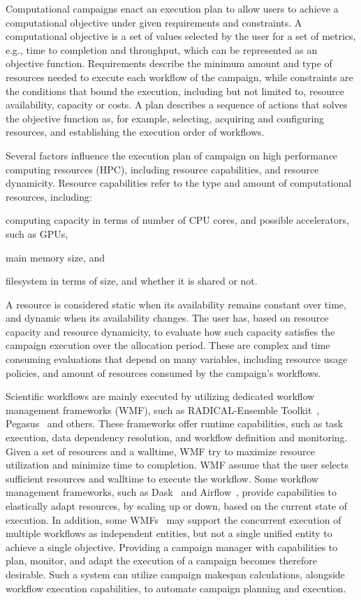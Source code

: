 Computational campaigns enact an execution plan to allow users to achieve a computational objective under given requirements and constraints.
A computational objective is a set of values selected by the user for a set of metrics, e.g., time to completion and throughput, which can be represented as an objective function.
Requirements describe the minimum amount and type of resources needed to execute each workflow of the campaign, while constraints are the conditions that bound the execution, including but not limited to, resource availability, capacity or costs.
A plan describes a sequence of actions that solves the objective function as, for example, selecting, acquiring and configuring resources, and establishing the execution order of workflows.

Several factors influence the execution plan of campaign on high performance computing resources (HPC), including resource capabilities, and resource dynamicity.
Resource capabilities refer to the type and amount of computational resources, including: 
\begin{inparaenum}[1)]
\item computing capacity in terms of number of CPU cores, and possible accelerators, such as GPUs,
\item main memory size, and
\item filesystem in terms of size, and whether it is shared or not.
\end{inparaenum}
A resource is considered static when its availability remains constant over time, and dynamic when its availability changes.
The user has, based on resource capacity and resource dynamicity, to evaluate how such capacity satisfies the campaign execution over the allocation period.
These are complex and time consuming evaluations that depend on many variables, including resource usage policies, and amount of resources consumed by the campaign’s workflows.

Scientific workflows are mainly executed by utilizing dedicated workflow management frameworks (WMF), such as RADICAL-Ensemble Toolkit~\cite{balasubramanian2018harnessing}, Pegasus~\cite{deelman2015pegasus} and others.
These frameworks offer runtime capabilities, such as task execution, data dependency resolution, and workflow definition and monitoring.
Given a set of resources and a walltime, WMF try to maximize resource utilization and minimize time to completion.
WMF assume that the user selects sufficient resources and walltime to execute the workflow.
Some workflow management frameworks, such as Dask~\cite{rocklin2015dask} and Airflow~\cite{airflow}, provide capabilities to elastically adapt resources, by scaling up or down, based on the current state of execution.
In addition, some  WMFs~\cite{deelman2015pegasus} may support the concurrent execution of multiple workflows as independent entities, but not a single unified entity to achieve a single objective.
Providing a campaign manager with capabilities to plan, monitor, and adapt the execution of a campaign becomes therefore desirable.
Such a system can utilize campaign makespan calculations, alongside workflow execution capabilities, to automate campaign planning and execution. 

